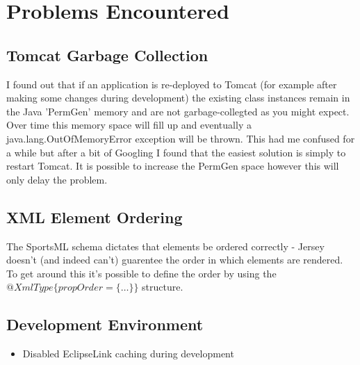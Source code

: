 \chapter{Problems Encountered} \label{problems-encountered}
\section{Tomcat Garbage Collection} \label{section:tomcatGarbageCollection}
I found out that if an application is re-deployed to Tomcat (for example after
making some changes during development) the existing class instances remain in
the Java 'PermGen' memory and are not garbage-collegted as you might expect.
Over time this memory space will fill up and eventually a
java.lang.OutOfMemoryError exception will be thrown. This had me confused for a
while but after a bit of Googling I found that the easiest solution is simply to
restart Tomcat. It is possible to increase the PermGen space however this will
only delay the problem.
\section{XML Element Ordering} \label{section:xmlElementOrdering}
The SportsML schema dictates that elements be ordered correctly - Jersey doesn't
(and indeed can't) guarentee the order in which elements are rendered. To get
around this it's possible to define the order by using the
\(@XmlType\{propOrder=\{\ldots\}\}\) structure.
\section{Development Environment} \label{section:developmentEnvironment}
\begin{itemize}
	\item Disabled EclipseLink caching during development
\end{itemize}